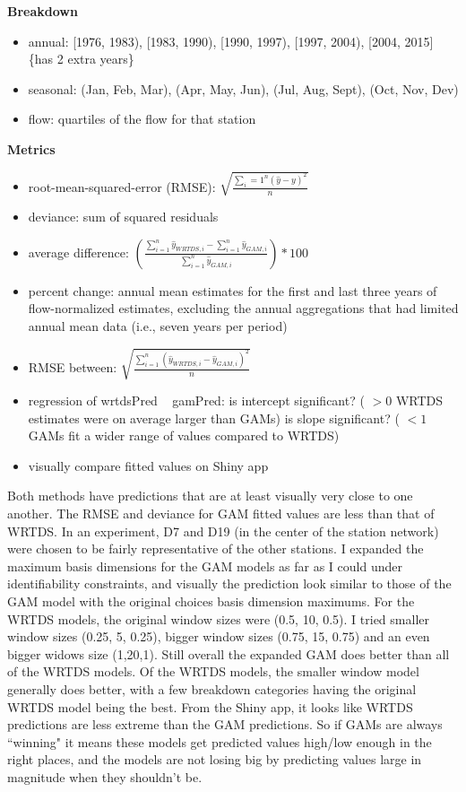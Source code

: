 \documentclass[12pt]{amsart}
\begin{document}
\textbf{Breakdown}
\begin{itemize}
\item annual: [1976, 1983), [1983, 1990), [1990, 1997), [1997, 2004), [2004, 2015] \{has 2 extra years\}
\item seasonal: (Jan, Feb, Mar), (Apr, May, Jun), (Jul, Aug, Sept), (Oct, Nov, Dev)
\item flow: quartiles of the flow for that station
\end{itemize}

\textbf{Metrics}
\begin{itemize}
\item root-mean-squared-error (RMSE): $\sqrt{\frac{\sum_{i}=1^n (\hat{y}-y)^2}{n}}$
\item deviance: sum of squared residuals
\item average difference: $\left(\frac{\sum_{i=1}^n \hat{y}_{WRTDS,i}-\sum_{i=1}^n \hat{y}_{GAM,i}}{\sum_{i=1}^n \hat{y}_{GAM,i}}\right)*100$
\item percent change: annual mean estimates for the first and last three years of flow-normalized estimates, excluding the annual aggregations that had limited annual mean data (i.e., seven years per period)%
\item RMSE between: $\sqrt{\frac{\sum_{i=1}^n (\hat{y}_{WRTDS,i}-\hat{y}_{GAM,i})^2}{n}}$
\item regression of wrtdsPred ~ gamPred: is intercept significant? ( $>0$ WRTDS estimates were on average larger than GAMs) is slope significant? ( $<1$ GAMs fit a wider range of values compared to WRTDS)
\item visually compare fitted values on Shiny app
\end{itemize}



Both methods have predictions that are at least visually very close to one another.
The RMSE and deviance for GAM fitted values are less than that of WRTDS. In an experiment, D7 and D19 (in the center of the station network) were chosen to be fairly representative of the other stations. I expanded the maximum basis dimensions for the GAM models as far as I could under identifiability constraints, and visually the prediction look similar to those of the GAM model with the original choices basis dimension maximums. For the WRTDS models, the original window sizes were (0.5, 10, 0.5). I tried smaller window sizes (0.25, 5, 0.25), bigger window sizes (0.75, 15, 0.75) and an even bigger widows size (1,20,1). Still overall the expanded GAM does better than all of the WRTDS models. Of the WRTDS models, the smaller window model generally does better, with a few breakdown categories having the original WRTDS model being the best. From the Shiny app, it looks like WRTDS predictions are less extreme than the GAM predictions. So if GAMs are always ``winning" it means these models get predicted values high/low enough in the right places, and the models are not losing big by predicting values large in magnitude when they shouldn't be.
\end{document}
